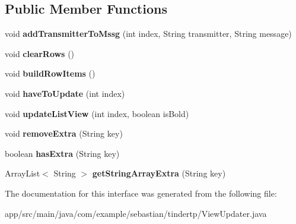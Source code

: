 \subsection*{Public Member Functions}
\begin{DoxyCompactItemize}
\item 
void {\bfseries add\+Transmitter\+To\+Mssg} (int index, String transmitter, String message)\hypertarget{interfacecom_1_1example_1_1sebastian_1_1tindertp_1_1ViewUpdater_a52e097cf79b22ea2e34dd4d5016353a9}{}\label{interfacecom_1_1example_1_1sebastian_1_1tindertp_1_1ViewUpdater_a52e097cf79b22ea2e34dd4d5016353a9}

\item 
void {\bfseries clear\+Rows} ()\hypertarget{interfacecom_1_1example_1_1sebastian_1_1tindertp_1_1ViewUpdater_abed119d248d653dee38abb7ac85b3811}{}\label{interfacecom_1_1example_1_1sebastian_1_1tindertp_1_1ViewUpdater_abed119d248d653dee38abb7ac85b3811}

\item 
void {\bfseries build\+Row\+Items} ()\hypertarget{interfacecom_1_1example_1_1sebastian_1_1tindertp_1_1ViewUpdater_a6cdecc2afe031aa36b7909070ece0a90}{}\label{interfacecom_1_1example_1_1sebastian_1_1tindertp_1_1ViewUpdater_a6cdecc2afe031aa36b7909070ece0a90}

\item 
void {\bfseries have\+To\+Update} (int index)\hypertarget{interfacecom_1_1example_1_1sebastian_1_1tindertp_1_1ViewUpdater_a6b98b5e9d4d254667d089c96be779a33}{}\label{interfacecom_1_1example_1_1sebastian_1_1tindertp_1_1ViewUpdater_a6b98b5e9d4d254667d089c96be779a33}

\item 
void {\bfseries update\+List\+View} (int index, boolean is\+Bold)\hypertarget{interfacecom_1_1example_1_1sebastian_1_1tindertp_1_1ViewUpdater_aac11290fb88ae5933f6f381da7a7ef46}{}\label{interfacecom_1_1example_1_1sebastian_1_1tindertp_1_1ViewUpdater_aac11290fb88ae5933f6f381da7a7ef46}

\item 
void {\bfseries remove\+Extra} (String key)\hypertarget{interfacecom_1_1example_1_1sebastian_1_1tindertp_1_1ViewUpdater_a9ab2a91c1147e2800e4df93799e6b525}{}\label{interfacecom_1_1example_1_1sebastian_1_1tindertp_1_1ViewUpdater_a9ab2a91c1147e2800e4df93799e6b525}

\item 
boolean {\bfseries has\+Extra} (String key)\hypertarget{interfacecom_1_1example_1_1sebastian_1_1tindertp_1_1ViewUpdater_a49ba96444e451dbc139363fb1d0f1cbc}{}\label{interfacecom_1_1example_1_1sebastian_1_1tindertp_1_1ViewUpdater_a49ba96444e451dbc139363fb1d0f1cbc}

\item 
Array\+List$<$ String $>$ {\bfseries get\+String\+Array\+Extra} (String key)\hypertarget{interfacecom_1_1example_1_1sebastian_1_1tindertp_1_1ViewUpdater_af3d8162b7f9c8119745988ff62df9708}{}\label{interfacecom_1_1example_1_1sebastian_1_1tindertp_1_1ViewUpdater_af3d8162b7f9c8119745988ff62df9708}

\end{DoxyCompactItemize}


The documentation for this interface was generated from the following file\+:\begin{DoxyCompactItemize}
\item 
app/src/main/java/com/example/sebastian/tindertp/View\+Updater.\+java\end{DoxyCompactItemize}
